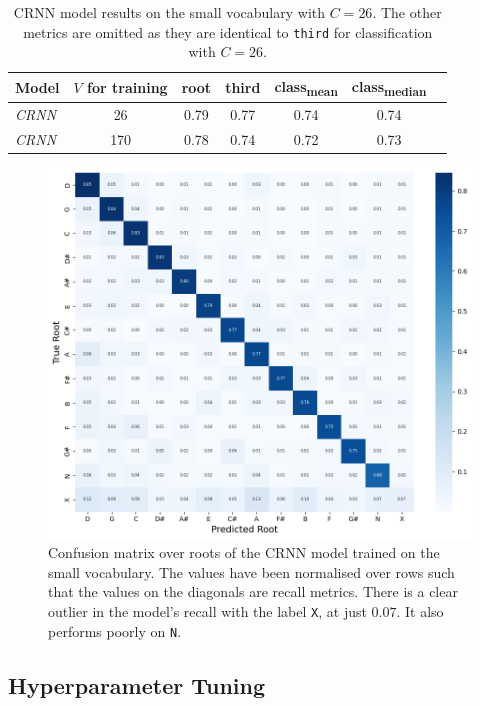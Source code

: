 \begin{table}[H]
    \centering
    \begin{tabular}{lcccccc}
        \toprule
        Model & $V$ for training & root & third & class\textsubscript{mean} & class\textsubscript{median} \\  
        \midrule
        \emph{CRNN} & 26 & 0.79 & 0.77 & 0.74 & 0.74 \\
        \emph{CRNN} & 170 & 0.78 & 0.74 & 0.72 & 0.73 \\
        \bottomrule
    \end{tabular}
    \caption{CRNN model results on the small vocabulary with $C=26$. The other metrics are omitted as they are identical to \texttt{third} for classification with $C=26$.}\label{tab:crnn_small_vocab}
\end{table}

\begin{figure}[H]
    \centering
    \includegraphics[width=1.0\textwidth]{figures/small_vocab_root_cm.png}
    \caption{Confusion matrix over roots of the CRNN model trained on the small vocabulary. The values have been normalised over rows such that the values on the diagonals are recall metrics. There is a clear outlier in the model's recall with the label \texttt{X}, at just $0.07$. It also performs poorly on \texttt{N}.}\label{fig:crnn_small_vocab_cm}
\end{figure}

\subsection{Hyperparameter Tuning}

